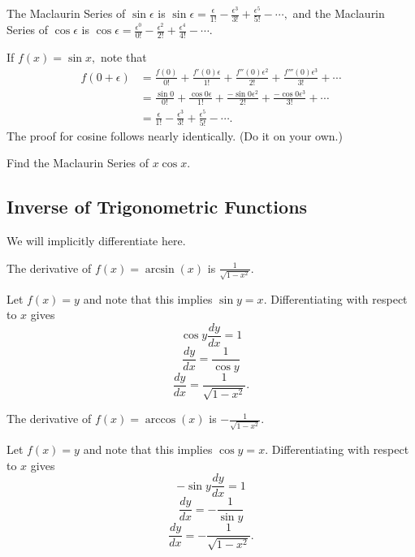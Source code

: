 \documentclass{article}
\begin{document}
\begin{theo}
The Maclaurin Series of $\sin \epsilon$ is $\sin\epsilon = \frac{\epsilon}{1!}-\frac{\epsilon^3}{3!}+\frac{\epsilon^5}{5!}-\cdots,$ and the Maclaurin Series of $\cos \epsilon$ is $\cos \epsilon = \frac{\epsilon^0}{0!}-\frac{\epsilon^2}{2!}+\frac{\epsilon^4}{4!}-\cdots.$
\end{theo}

\begin{pro}
If $f(x)=\sin x,$ note that
\begin{align*}
f(0+\epsilon)&=\frac{f(0)}{0!}+\frac{f'(0)\epsilon}{1!}+\frac{f''(0)\epsilon^2}{2!}+\frac{f'''(0)\epsilon^3}{3!}+\cdots \\
&=\frac{\sin 0}{0!}+\frac{\cos 0\epsilon}{1!}+\frac{-\sin 0\epsilon^2}{2!}+\frac{-\cos 0\epsilon^3}{3!}+\cdots \\
&=\frac{\epsilon}{1!}-\frac{\epsilon^3}{3!}+\frac{\epsilon^5}{5!}-\cdots.
\end{align*}
The proof for cosine follows nearly identically. (Do it on your own.)
\end{pro}

\begin{exer}
Find the Maclaurin Series of $x\cos x.$
\end{exer}

\subsection{Inverse of Trigonometric Functions}

We will implicitly differentiate here.

\begin{theo}
The derivative of $f(x)=\arcsin(x)$ is $\frac{1}{\sqrt{1-x^2}}.$
\end{theo}

\begin{pro}
Let $f(x)=y$ and note that this implies $\sin y=x.$ Differentiating with respect to $x$ gives
\[\cos y\frac{dy}{dx}=1\]
\[\frac{dy}{dx}=\frac{1}{\cos y}\]
\[\frac{dy}{dx}=\frac{1}{\sqrt{1-x^2}}.\]
\end{pro}

\begin{theo}
The derivative of $f(x)=\arccos(x)$ is $-\frac{1}{\sqrt{1-x^2}}.$
\end{theo}

\begin{pro}
Let $f(x)=y$ and note that this implies $\cos y=x.$ Differentiating with respect to $x$ gives
\[-\sin y\frac{dy}{dx}=1\]
\[\frac{dy}{dx}=-\frac{1}{\sin y}\]
\[\frac{dy}{dx}=-\frac{1}{\sqrt{1-x^2}}.\]
\end{pro}
\end{document}
